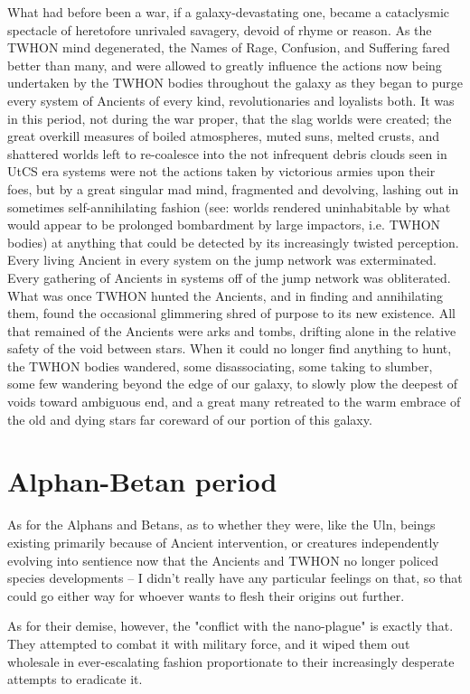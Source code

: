 What had before been a war, if a galaxy-devastating one, became a
cataclysmic spectacle of heretofore unrivaled savagery, devoid of
rhyme or reason. As the TWHON mind degenerated, the Names of Rage,
Confusion, and Suffering fared better than many, and were allowed to
greatly influence the actions now being undertaken by the TWHON bodies
throughout the galaxy as they began to purge every system of Ancients
of every kind, revolutionaries and loyalists both. It was in this
period, not during the war proper, that the slag worlds were created;
the great overkill measures of boiled atmospheres, muted suns, melted
crusts, and shattered worlds left to re-coalesce into the not
infrequent debris clouds seen in UtCS era systems were not the actions
taken by victorious armies upon their foes, but by a great singular
mad mind, fragmented and devolving, lashing out in sometimes
self-annihilating fashion (see: worlds rendered uninhabitable by what
would appear to be prolonged bombardment by large impactors,
i.e. TWHON bodies) at anything that could be detected by its
increasingly twisted perception. Every living Ancient in every system
on the jump network was exterminated. Every gathering of Ancients in
systems off of the jump network was obliterated. What was once TWHON
hunted the Ancients, and in finding and annihilating them, found the
occasional glimmering shred of purpose to its new existence. All that
remained of the Ancients were arks and tombs, drifting alone in the
relative safety of the void between stars. When it could no longer
find anything to hunt, the TWHON bodies wandered, some disassociating,
some taking to slumber, some few wandering beyond the edge of our
galaxy, to slowly plow the deepest of voids toward ambiguous end,
and a great many retreated to the warm embrace of the old and dying
stars far coreward of our portion of this galaxy.

\section{Alphan-Betan period}
As for the Alphans and Betans, as to whether they were, like the Uln,
beings existing primarily because of Ancient intervention, or
creatures independently evolving into sentience now that the Ancients
and TWHON no longer policed species developments -- I didn't really
have any particular feelings on that, so that could go either way for
whoever wants to flesh their origins out further.

As for their demise, however, the "conflict with the nano-plague" is
exactly that. They attempted to combat it with military force, and it
wiped them out wholesale in ever-escalating fashion proportionate to
their increasingly desperate attempts to eradicate it.


